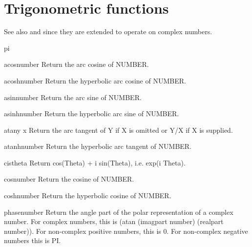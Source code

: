\section{Trigonometric functions}
\label{sec:trig-funct}

See also  and  since they are extended to operate
on complex numbers.

\begin{constant}{pi}{}{}{}
  
\end{constant}

\begin{function}{acos}{number}{}{}
  Return the arc cosine of NUMBER.
\end{function}

\begin{function}{acosh}{number}{}{}
  Return the hyperbolic arc cosine of NUMBER.
\end{function}

\begin{function}{asin}{number}{}{}
  Return the arc sine of NUMBER.
\end{function}

\begin{function}{asinh}{number}{}{}
  Return the hyperbolic arc sine of NUMBER.
\end{function}

\begin{function}{atan}{y \op x}{}{}
  Return the arc tangent of Y if X is omitted or Y/X if X is supplied.
\end{function}

\begin{function}{atanh}{number}{}{}
  Return the hyperbolic arc tangent of NUMBER.
\end{function}

\begin{function}{cis}{theta}{}{}
  Return cos(Theta) + i sin(Theta), i.e. exp(i Theta).
\end{function}

\begin{function}{cos}{number}{}{}
  Return the cosine of NUMBER.
\end{function}

\begin{function}{cosh}{number}{}{}
  Return the hyperbolic cosine of NUMBER.
\end{function}

\begin{function}{phase}{number}{}{}
  Return the angle part of the polar representation of a complex number.
  For complex numbers, this is (atan (imagpart number) (realpart number)).
  For non-complex positive numbers, this is 0. For non-complex negative
  numbers this is PI.
\end{function}

